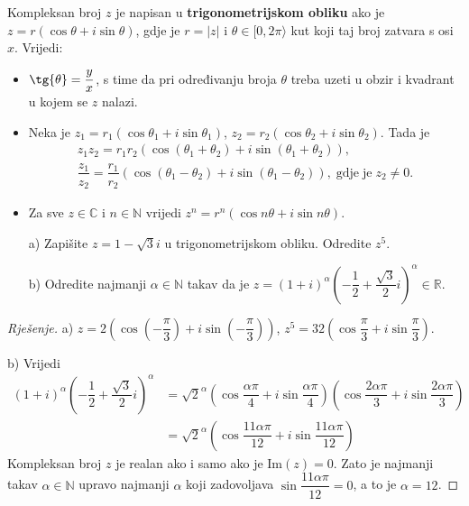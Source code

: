\begin{remark}
Kompleksan broj $z$ je napisan u \textbf{trigonometrijskom obliku} ako je $z=r(\cos{\theta}+i\sin{\theta})$, gdje je $r=|z|$ i $\theta\in [0, 2\pi \rangle$ kut koji taj broj zatvara s osi $x$. Vrijedi:
\begin{itemize}
\item $\tg{\theta}=\dfrac{y}{x}$, s time da pri određivanju broja $\theta$ treba uzeti u obzir i kvadrant u kojem se $z$ nalazi.
\item Neka je $z_1=r_1(\cos{\theta_1}+i\sin{\theta_1})$, $z_2=r_2(\cos{\theta_2}+i\sin{\theta_2})$. Tada je
\begin{gather*}
z_1z_2=r_1r_2\left(\cos(\theta_1+\theta_2)+i\sin(\theta_1+\theta_2)\right),\\
\dfrac{z_1}{z_2}=\dfrac{r_1}{r_2}\left(\cos(\theta_1-\theta_2)+i\sin(\theta_1-\theta_2)\right), \;\mathrm{gdje}\;\mathrm{je}\; z_2\neq 0.
\end{gather*}
\item Za sve $z\in \mathbb{C}$ i $n\in \mathbb{N}$ vrijedi $z^n=r^n(\cos{n\theta}+i\sin{n\theta})$.
\end{itemize}
\end{remark}

\begin{exercise} \textbf{}
\begin{itemize}
\item[a)] Zapišite $z=1-\sqrt{3}i$ u trigonometrijskom obliku. Odredite $z^5$.
\item[b)] Odredite najmanji $\alpha\in \mathbb{N}$ takav da je $z=\left(1+i\right)^{\alpha}\left(-\dfrac{1}{2}+\dfrac{\sqrt{3}}{2}i\right)^{\alpha}\in \mathbb{R}$.
\end{itemize}
\end{exercise}
\begin{proof}[Rješenje]
a) $z=2\left(\cos\left(-\dfrac{\pi}{3}\right)+i\sin\left(-\dfrac{\pi}{3}\right)\right)$, $z^5=32\left(\cos{\dfrac{\pi}{3}}+i\sin{\dfrac{\pi}{3}}\right)$.

b) Vrijedi 
\begin{align*}
\left(1+i\right)^{\alpha}\left(-\dfrac{1}{2}+\dfrac{\sqrt{3}}{2}i\right)^{\alpha}&=\sqrt{2}^{\alpha}\left(\cos{\dfrac{\alpha \pi}{4}}+i\sin{\dfrac{\alpha \pi}{4}}\right)\left(\cos{\dfrac{2\alpha \pi}{3}}+i\sin{\dfrac{2\alpha \pi}{3}}\right)\\
&=\sqrt{2}^{\alpha}\left(\cos{\dfrac{11\alpha \pi}{12}}+i\sin{\dfrac{11\alpha \pi}{12}}\right)
\end{align*}
Kompleksan broj $z$ je realan ako i samo ako je $\mathrm{Im}(z)=0$. Zato je najmanji takav $\alpha\in \mathbb{N}$ upravo najmanji $\alpha$ koji zadovoljava $\sin{\dfrac{11\alpha \pi}{12}}=0$, a to je $\alpha=12$.
\end{proof}

